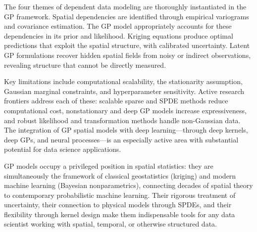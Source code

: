 \documentclass[conference]{IEEEtran}
\begin{document}
The four themes of dependent data modeling are thoroughly instantiated in the GP framework. Spatial dependencies are identified through empirical variograms and covariance estimation. The GP model appropriately accounts for these dependencies in its prior and likelihood. Kriging equations produce optimal predictions that exploit the spatial structure, with calibrated uncertainty. Latent GP formulations recover hidden spatial fields from noisy or indirect observations, revealing structure that cannot be directly measured.

Key limitations include computational scalability, the stationarity assumption, Gaussian marginal constraints, and hyperparameter sensitivity. Active research frontiers address each of these: scalable sparse and SPDE methods reduce computational cost, nonstationary and deep GP models increase expressiveness, and robust likelihood and transformation methods handle non-Gaussian data. The integration of GP spatial models with deep learning---through deep kernels, deep GPs, and neural processes---is an especially active area with substantial potential for data science applications.

GP models occupy a privileged position in spatial statistics: they are simultaneously the framework of classical geostatistics (kriging) and modern machine learning (Bayesian nonparametrics), connecting decades of spatial theory to contemporary probabilistic machine learning. Their rigorous treatment of uncertainty, their connection to physical models through SPDEs, and their flexibility through kernel design make them indispensable tools for any data scientist working with spatial, temporal, or otherwise structured data.

\end{document}
